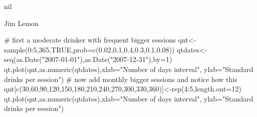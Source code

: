 \begin{Value}
nil
\end{Value}
\begin{Author}\relax
Jim Lemon
\end{Author}
\begin{SeeAlso}\relax
{}
\end{SeeAlso}
\begin{Examples}
\begin{ExampleCode}
 # first a moderate drinker with frequent bigger sessions
 qnt<-sample(0:5,365,TRUE,prob=c(0.02,0.1,0.4,0.3,0.1,0.08))
 qtdates<-seq(as.Date("2007-01-01"),as.Date("2007-12-31"),by=1)
 qt.plot(qnt,as.numeric(qtdates),xlab="Number of days interval",
  ylab="Standard drinks per session")
 # now add monthly bigger sessions and notice how this
 qnt[c(30,60,90,120,150,180,210,240,270,300,330,360)]<-rep(4:5,length.out=12)
 qt.plot(qnt,as.numeric(qtdates),xlab="Number of days interval",
  ylab="Standard drinks per session")
\end{ExampleCode}
\end{Examples}

